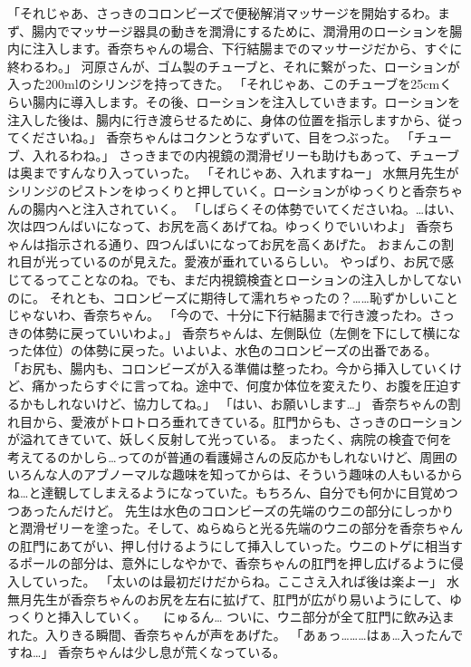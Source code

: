 「それじゃあ、さっきのコロンビーズで便秘解消マッサージを開始するわ。まず、腸内でマッサージ器具の動きを潤滑にするために、潤滑用のローションを腸内に注入します。香奈ちゃんの場合、下行結腸までのマッサージだから、すぐに終わるわ。」
河原さんが、ゴム製のチューブと、それに繋がった、ローションが入った200mlのシリンジを持ってきた。
「それじゃあ、このチューブを25cmくらい腸内に導入します。その後、ローションを注入していきます。ローションを注入した後は、腸内に行き渡らせるために、身体の位置を指示しますから、従ってくださいね。」
香奈ちゃんはコクンとうなずいて、目をつぶった。
「チューブ、入れるわね。」
さっきまでの内視鏡の潤滑ゼリーも助けもあって、チューブは奥まですんなり入っていった。
「それじゃあ、入れますねー」
水無月先生がシリンジのピストンをゆっくりと押していく。ローションがゆっくりと香奈ちゃんの腸内へと注入されていく。
「しばらくその体勢でいてくださいね。…はい、次は四つんばいになって、お尻を高くあげてね。ゆっくりでいいわよ」
香奈ちゃんは指示される通り、四つんばいになってお尻を高くあげた。
おまんこの割れ目が光っているのが見えた。愛液が垂れているらしい。
やっぱり、お尻で感じてるってことなのね。でも、まだ内視鏡検査とローションの注入しかしてないのに。
それとも、コロンビーズに期待して濡れちゃったの？……恥ずかしいことじゃないわ、香奈ちゃん。
「今ので、十分に下行結腸まで行き渡ったわ。さっきの体勢に戻っていいわよ。」
香奈ちゃんは、左側臥位（左側を下にして横になった体位）の体勢に戻った。いよいよ、水色のコロンビーズの出番である。
「お尻も、腸内も、コロンビーズが入る準備は整ったわ。今から挿入していくけど、痛かったらすぐに言ってね。途中で、何度か体位を変えたり、お腹を圧迫するかもしれないけど、協力してね。」
「はい、お願いします…」
香奈ちゃんの割れ目から、愛液がトロトロろ垂れてきている。肛門からも、さっきのローションが溢れてきていて、妖しく反射して光っている。
まったく、病院の検査で何を考えてるのかしら…ってのが普通の看護婦さんの反応かもしれないけど、周囲のいろんな人のアブノーマルな趣味を知ってからは、そういう趣味の人もいるからね…と達観してしまえるようになっていた。もちろん、自分でも何かに目覚めつつあったんだけど。
先生は水色のコロンビーズの先端のウニの部分にしっかりと潤滑ゼリーを塗った。そして、ぬらぬらと光る先端のウニの部分を香奈ちゃんの肛門にあてがい、押し付けるようにして挿入していった。ウニのトゲに相当するポールの部分は、意外にしなやかで、香奈ちゃんの肛門を押し広げるように侵入していった。
「太いのは最初だけだからね。ここさえ入れば後は楽よー」
水無月先生が香奈ちゃんのお尻を左右に拡げて、肛門が広がり易いようにして、ゆっくりと挿入していく。
　にゅるん…
ついに、ウニ部分が全て肛門に飲み込まれた。入りきる瞬間、香奈ちゃんが声をあげた。
「あぁっ………はぁ…入ったんですね…」
香奈ちゃんは少し息が荒くなっている。
